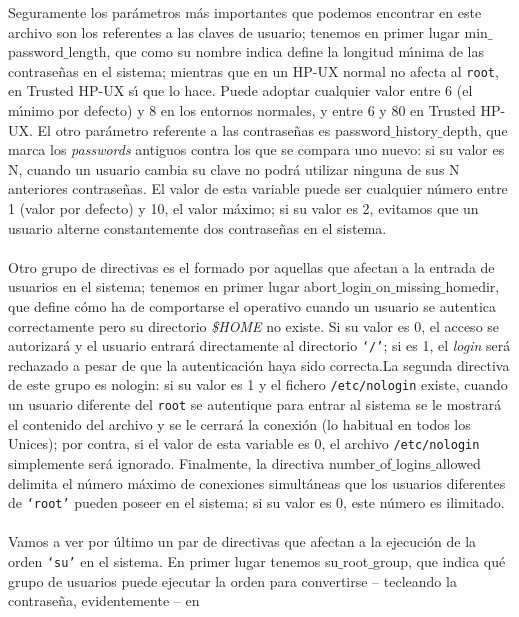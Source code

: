Seguramente los par\'ametros m\'as importantes que podemos encontrar en este
archivo son los referentes a las claves de usuario; tenemos en primer lugar 
{\sc min$\_$password$\_$length}, que como su nombre indica
define la longitud m\'{\i}nima de las contrase\~nas en el sistema; mientras que
en un HP-UX normal no afecta al {\tt root}, en Trusted HP-UX s\'{\i} que lo 
hace. Puede adoptar cualquier valor entre 6 (el m\'{\i}nimo por defecto) y 8 en
los entornos normales, y entre 6 y 80 en Trusted HP-UX. El otro par\'ametro
referente a las contrase\~nas es {\sc password$\_$history$\_$depth}, que marca
los {\it passwords} antiguos contra los que se compara uno nuevo: si su valor es
N, cuando un usuario cambia su clave no podr\'a utilizar ninguna de sus N
anteriores contrase\~nas. El valor de esta variable puede ser cualquier n\'umero
entre 1 (valor por defecto) y 10, el valor m\'aximo; si su valor es 2, evitamos
que un usuario alterne constantemente dos contrase\~nas en el sistema.\\
\\Otro grupo de directivas es el formado por aquellas que afectan a la entrada
de usuarios en el sistema; tenemos en primer lugar {\sc 
abort$\_$login$\_$on$\_$missing$\_$homedir}, que define c\'omo ha de 
comportarse el operativo cuando un usuario se autentica correctamente pero su 
directorio {\it \$HOME} no existe. Si su valor es 0, el acceso se autorizar\'a y
el usuario entrar\'a directamente al directorio {\tt `/'}; si es 1, el {\it 
login} ser\'a rechazado a pesar de que la autenticaci\'on haya sido correcta.La 
segunda directiva de este grupo es {\sc nologin}: si su valor es 1 y el fichero
{\tt /etc/nologin} existe, cuando un usuario diferente del {\tt root} se 
autentique para entrar al sistema se le mostrar\'a el contenido del archivo y
se le cerrar\'a la conexi\'on (lo habitual en todos los Unices); por contra, si
el valor de esta variable es 0, el archivo {\tt /etc/nologin} simplemente ser\'a
ignorado. Finalmente, la directiva {\sc number$\_$of$\_$logins$\_$allowed} 
delimita el n\'umero m\'aximo de conexiones simult\'aneas que los usuarios 
diferentes de {\tt `root'} pueden poseer en el sistema; si su valor es 0, este
n\'umero es ilimitado.\\
\\Vamos a ver por \'ultimo un par de directivas que afectan a la ejecuci\'on 
de la orden {\tt `su'} en el sistema. En primer lugar tenemos {\sc 
su$\_$root$\_$group}, que indica qu\'e grupo de usuarios puede ejecutar la 
orden para convertirse -- tecleando la contrase\~na, evidentemente -- en 
